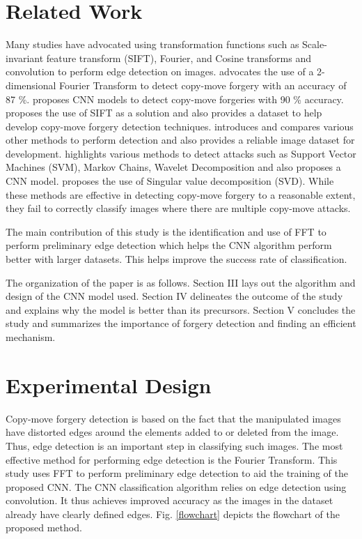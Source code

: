 \documentclass[conference]{IEEEtran}
\begin{document}
\section{Related Work}
Many studies have advocated using transformation functions such as Scale-invariant feature transform (SIFT), Fourier, and Cosine transforms \cite{b1} and convolution to perform edge detection on images. \cite{b2} advocates the use of a 2-dimensional Fourier Transform to detect copy-move forgery with an accuracy of 87 \%. \cite{b3} proposes CNN models to detect copy-move forgeries with 90 \% accuracy. \cite{b4} proposes the use of SIFT as a solution and also provides a dataset to help develop copy-move forgery detection techniques. \cite{b5} introduces and compares various other methods to perform detection and also provides a reliable image dataset for development. \cite{b6} highlights various methods to detect attacks such as Support Vector Machines (SVM), Markov Chains, Wavelet Decomposition and also proposes a CNN model. \cite{b8} proposes the use of Singular value decomposition (SVD). While these methods are effective in detecting copy-move forgery to a reasonable extent, they fail to correctly classify images where there are multiple copy-move attacks.

The main contribution of this study is the identification and use of FFT to perform preliminary edge detection which helps the CNN algorithm perform better with larger datasets. This helps improve the success rate of classification.

The organization of the paper is as follows. Section III lays out the algorithm and design of the CNN model used. Section IV delineates the outcome of the study and explains why the model is better than its precursors. Section V concludes the study and summarizes the importance of forgery detection and finding an efficient mechanism.


\section{Experimental Design}
Copy-move forgery detection is based on the fact that the manipulated images have distorted edges around the elements added to or deleted from the image. Thus, edge detection is an important step in classifying such images. The most effective method for performing edge detection is the Fourier Transform. This study uses FFT to perform preliminary edge detection to aid the training of the proposed CNN. The CNN classification algorithm relies on edge detection using convolution. It thus achieves improved accuracy as the images in the dataset already have clearly defined edges. Fig. \ref{flowchart} depicts the flowchart of the proposed method.
\end{document}
